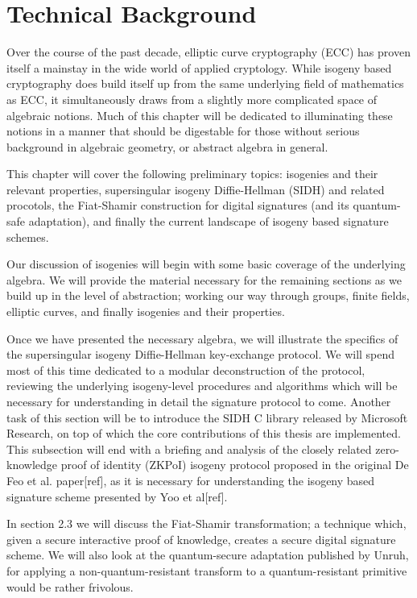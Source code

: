 \chapter{Technical Background}

Over the course of the past decade, elliptic curve cryptography (ECC) has proven itself a mainstay in the wide world of applied cryptology. While isogeny based cryptography does build itself up from the same underlying field of mathematics as ECC, it simultaneously draws from a slightly more complicated space of algebraic notions. Much of this chapter will be dedicated to illuminating these notions in a manner that should be digestable for those without serious background in algebraic geometry, or abstract algebra in general.

This chapter will cover the following preliminary topics: isogenies and their relevant properties, supersingular isogeny Diffie-Hellman (SIDH) and related procotols, the Fiat-Shamir construction for digital signatures (and its quantum-safe adaptation), and finally the current landscape of isogeny based signature schemes.

Our discussion of isogenies will begin with some basic coverage of the underlying algebra. We will provide the material necessary for the remaining sections as we build up in the level of abstraction; working our way through groups, finite fields, elliptic curves, and finally isogenies and their properties.

Once we have presented the necessary algebra, we will illustrate the specifics of the supersingular isogeny Diffie-Hellman key-exchange protocol. We will spend most of this time dedicated to a modular deconstruction of the protocol, reviewing the underlying isogeny-level procedures and algorithms which will be necessary for understanding in detail the signature protocol to come. Another task of this section will be to introduce the SIDH C library released by Microsoft Research, on top of which the core contributions of this thesis are implemented. This subsection will end with a briefing and analysis of the closely related zero-knowledge proof of identity (ZKPoI) isogeny protocol proposed in the original De Feo et al. paper[ref], as it is necessary for understanding the isogeny based signature scheme presented by Yoo et al[ref].

In section 2.3 we will discuss the Fiat-Shamir transformation; a technique which, given a secure interactive proof of knowledge, creates a secure digital signature scheme. We will also look at the quantum-secure adaptation published by Unruh, for applying a non-quantum-resistant transform to a quantum-resistant primitive would be rather frivolous.

